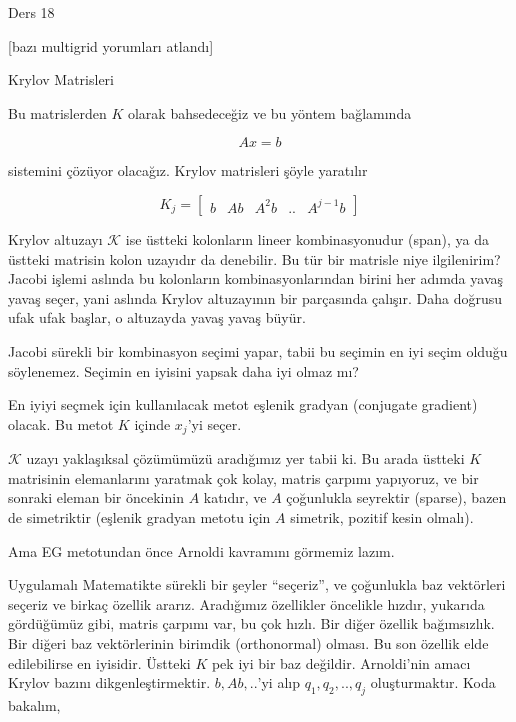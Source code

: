 \documentclass[12pt,fleqn]{article}\usepackage{../../common}
\begin{document}
Ders 18

[bazı multigrid yorumları atlandı]

Krylov Matrisleri 

Bu matrislerden $K$ olarak bahsedeceğiz ve bu yöntem bağlamında 

$$ Ax = b $$

sistemini çözüyor olacağız. Krylov matrisleri şöyle yaratılır

$$ K_j = \left[\begin{array}{rrrrr}
b & Ab & A^2b & .. & A^{j-1}b
\end{array}\right] $$

Krylov altuzayı $\mathscr{K}$ ise üstteki kolonların lineer kombinasyonudur
(span), ya da üstteki matrisin kolon uzayıdır da denebilir. Bu tür bir
matrisle niye ilgilenirim? Jacobi işlemi aslında bu kolonların
kombinasyonlarından birini her adımda yavaş yavaş seçer, yani aslında
Krylov altuzayının bir parçasında çalışır. Daha doğrusu ufak ufak başlar, o
altuzayda yavaş yavaş büyür.

Jacobi sürekli bir kombinasyon seçimi yapar, tabii bu seçimin en iyi seçim
olduğu söylenemez. Seçimin en iyisini yapsak daha iyi olmaz mı? 

En iyiyi seçmek için kullanılacak metot eşlenik gradyan (conjugate
gradient) olacak. Bu metot $K$ içinde $x_j$'yi seçer. 

$\mathscr{K}$ uzayı yaklaşıksal çözümümüzü aradığımız yer tabii ki. Bu arada üstteki
$K$ matrisinin elemanlarını yaratmak çok kolay, matris çarpımı yapıyoruz, ve
bir sonraki eleman bir öncekinin $A$ katıdır, ve $A$ çoğunlukla seyrektir
(sparse), bazen de simetriktir (eşlenik gradyan metotu için $A$ simetrik,
pozitif kesin olmalı).

Ama EG metotundan önce Arnoldi kavramını görmemiz lazım. 

Uygulamalı Matematikte sürekli bir şeyler ``seçeriz'', ve çoğunlukla baz
vektörleri seçeriz ve birkaç özellik ararız. Aradığımız özellikler
öncelikle hızdır, yukarıda gördüğümüz gibi, matris çarpımı var, bu çok
hızlı. Bir diğer özellik bağımsızlık. Bir diğeri baz vektörlerinin birimdik
(orthonormal) olması. Bu son özellik elde edilebilirse en iyisidir. Üstteki
$K$ pek iyi bir baz değildir. Arnoldi'nin amacı Krylov bazını
dikgenleştirmektir. $b,Ab,..$'yi alıp $q_1,q_2,..,q_j$ oluşturmaktır. Koda
bakalım,
\end{document}

